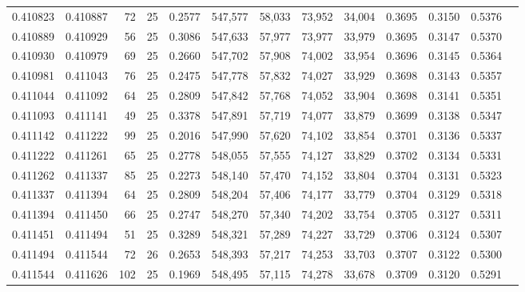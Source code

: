 \begin{tabular}{rrrrrrrrrrrrr}
0.410823 & 0.410887 &    72 &  25 &                                     0.2577 & 547,577 &  58,033 &  73,952 &  34,004 & 0.3695 & 0.3150 & 0.5376 \\
0.410889 & 0.410929 &    56 &  25 &                                     0.3086 & 547,633 &  57,977 &  73,977 &  33,979 & 0.3695 & 0.3147 & 0.5370 \\
0.410930 & 0.410979 &    69 &  25 &                                     0.2660 & 547,702 &  57,908 &  74,002 &  33,954 & 0.3696 & 0.3145 & 0.5364 \\
0.410981 & 0.411043 &    76 &  25 &                                     0.2475 & 547,778 &  57,832 &  74,027 &  33,929 & 0.3698 & 0.3143 & 0.5357 \\
0.411044 & 0.411092 &    64 &  25 &                                     0.2809 & 547,842 &  57,768 &  74,052 &  33,904 & 0.3698 & 0.3141 & 0.5351 \\
0.411093 & 0.411141 &    49 &  25 &                                     0.3378 & 547,891 &  57,719 &  74,077 &  33,879 & 0.3699 & 0.3138 & 0.5347 \\
0.411142 & 0.411222 &    99 &  25 &                                     0.2016 & 547,990 &  57,620 &  74,102 &  33,854 & 0.3701 & 0.3136 & 0.5337 \\
0.411222 & 0.411261 &    65 &  25 &                                     0.2778 & 548,055 &  57,555 &  74,127 &  33,829 & 0.3702 & 0.3134 & 0.5331 \\
0.411262 & 0.411337 &    85 &  25 &                                     0.2273 & 548,140 &  57,470 &  74,152 &  33,804 & 0.3704 & 0.3131 & 0.5323 \\
0.411337 & 0.411394 &    64 &  25 &                                     0.2809 & 548,204 &  57,406 &  74,177 &  33,779 & 0.3704 & 0.3129 & 0.5318 \\
0.411394 & 0.411450 &    66 &  25 &                                     0.2747 & 548,270 &  57,340 &  74,202 &  33,754 & 0.3705 & 0.3127 & 0.5311 \\
0.411451 & 0.411494 &    51 &  25 &                                     0.3289 & 548,321 &  57,289 &  74,227 &  33,729 & 0.3706 & 0.3124 & 0.5307 \\
0.411494 & 0.411544 &    72 &  26 &                                     0.2653 & 548,393 &  57,217 &  74,253 &  33,703 & 0.3707 & 0.3122 & 0.5300 \\
0.411544 & 0.411626 &   102 &  25 &                                     0.1969 & 548,495 &  57,115 &  74,278 &  33,678 & 0.3709 & 0.3120 & 0.5291 \\

\end{tabular}
